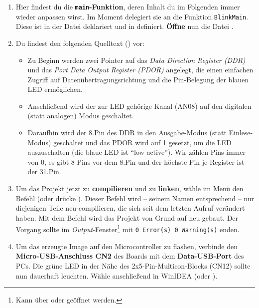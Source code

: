 \begin{enumerate}
\item
Hier findest du die \textbf{\lstinline|main|-Funktion}, deren Inhalt du im Folgenden immer wieder anpassen wirst.
Im Moment delegiert sie an die Funktion \lstinline|BlinkMain|.
Diese ist in der Datei  deklariert und in  definiert.
\textbf{Öffne} nun die Datei \textbf{}.

\item 
Du findest den folgenden Quelltext () vor:

%
\begin{itemize}
\item 
Zu Beginn werden zwei Pointer auf das \emph{Data Direction Register (DDR)} und das \emph{Port Data Output Register (PDOR)} angelegt, die einen einfachen Zugriff auf Datenübertragungsrichtung und die Pin-Belegung der blauen LED ermöglichen.

\item 
Anschließend wird der zur LED gehörige Kanal (AN08) auf den digitalen (statt analogen) Modus geschaltet.

\item 
Daraufhin wird der 8.\;Pin des DDR in den Ausgabe-Modus (statt Einlese-Modus) geschaltet und das PDOR wird auf 1 gesetzt, um die LED auszuschalten (\dasheisst die blaue LED ist \enquote{low active}).
Wir zählen Pins immer von 0, \dasheisst es gibt 8 Pins vor dem 8.\;Pin und der höchste Pin je Register ist der 31.\;Pin.
\end{itemize}

\item 
Um das Projekt jetzt zu \textbf{compilieren} und zu \textbf{linken}, wähle im Menü  den Befehl  (oder drücke ).
Dieser Befehl wird -- seinem Namen entsprechend -- nur diejenigen Teile neu-compilieren, die sich seit dem letzten Aufruf verändert haben.
Mit dem Befehl  wird das Projekt von Grund auf neu gebaut.
Der Vorgang sollte im \emph{Output}-Fenster\footnote{Kann über  oder  geöffnet werden.} mit \texttt{0 Error(s)  0 Warning(s)} enden.

\item 
Um das erzeugte Image auf den Microcontroller zu flashen, verbinde den \textbf{Micro-USB-Anschluss CN2} des Boards mit dem \textbf{Data-USB-Port} des PCs.
Die grüne LED in der Nähe des 2x5-Pin-Multicon-Blocks (CN12) sollte nun dauerhaft leuchten.
Wähle anschließend in WinIDEA \textbf{} (oder ).



\end{enumerate}
